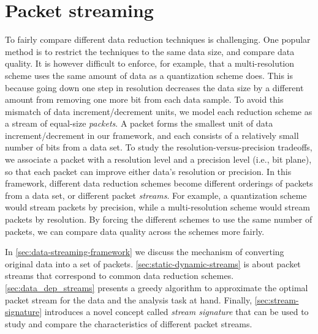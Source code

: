 \section{Packet streaming}\label{sec:terminologies}

To fairly compare different data reduction techniques is challenging. One popular method is to
restrict the techniques to the same data size, and compare data quality. It is however difficult to
enforce, for example, that a multi-resolution scheme uses the same amount of data as a quantization
scheme does. This is because going down one step in resolution decreases the data size by a
different amount from removing one more bit from each data sample. To avoid this mismatch of data
increment/decrement units, we model each reduction scheme as a stream of equal-size \emph{packets}.
A packet forms the smallest unit of data increment/decrement in our framework, and each consists of
a relatively small number of bits from a data set. To study the resolution-versus-precision
tradeoffs, we associate a packet with a resolution level and a precision level (i.e., bit plane), so
that each packet can improve either data's resolution or precision. In this framework, different
data reduction schemes become different orderings of packets from a data set, or different packet
\emph{streams}. For example, a quantization scheme would stream packets by precision, while a
multi-resolution scheme would stream packets by resolution. By forcing the different schemes to use
the same number of packets, we can compare data quality across the schemes more fairly.

In \cref{sec:data-streaming-framework} we discuss the mechanism of converting original data into
a set of packets. \cref{sec:static-dynamic-streams} is about packet streams that correspond to
common data reduction schemes. \cref{sec:data_dep_streams} presents a greedy algorithm to
approximate the optimal packet stream for the data and the analysis task at hand. Finally,
\cref{sec:stream-signature} introduces a novel concept called \emph{stream signature} that can be
used to study and compare the characteristics of different packet streams.

